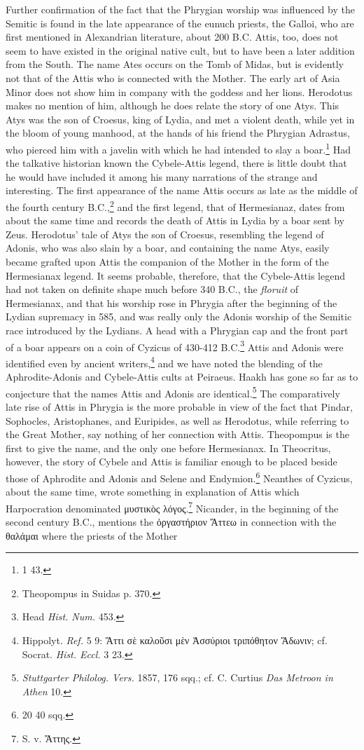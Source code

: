 \documentclass[a4paper, 11pt, oneside, polutonikogreek, english]{article}
\begin{document}
Further confirmation of the fact that the Phrygian worship was influenced by the Semitic is found in the late appearance of the eunuch priests, the Galloi, who are first mentioned in Alexandrian literature, about 200 \textsc{B.C.} Attis, too, does not seem to have existed in the original native cult, but to have been a later addition from the South. The name Ates occurs on the Tomb of Midas, but is evidently not that of the Attis who is connected with the Mother. The early art of Asia Minor does not show him in company with the goddess and her lions. Herodotus makes no mention of him, although he does relate the story of one Atys. This Atys was the son of Croesus, king of Lydia, and met a violent death, while yet in the bloom of young manhood, at the hands of his friend the Phrygian Adrastus, who pierced him with a javelin with which he had intended to slay a boar.\footnote{1 43.} Had the talkative historian known the Cybele-Attis legend, there is little doubt that he would have included it among his many narrations of the strange and interesting. The first appearance of the name Attis occurs as late as the middle of the fourth century \textsc{B.C.},\footnote{Theopompus in Suidas p. 370.} and the first legend, that of Hermesianaz, dates from about the same time and records the death of Attis in Lydia by a boar sent by Zeus. Herodotus' tale of Atys the son of Croesus, resembling the legend of Adonis, who was also slain by a boar, and containing the name Atys, easily became grafted upon Attis the companion of the Mother in the form of the Hermesianax legend. It seems probable, therefore, that the Cybele-Attis legend had not taken on definite shape much before 340 \textsc{B.C.}, the \emph{floruit} of Hermesianax, and that his worship rose in Phrygia after the beginning of the Lydian supremacy in 585, and was really only the Adonis worship of the Semitic race introduced by the Lydians. A head with a Phrygian cap and the front part of a boar appears on a coin of Cyzicus of 430-412 \textsc{B.C.}\footnote{Head \emph{Hist. Num.} 453.} Attis and Adonis were identified even by ancient writers,\footnote{Hippolyt. \emph{Ref.} 5 9: Ἄττι σὲ καλοῦσι μὲν Ἀσσύριοι τριπόθητον Ἄδωνιν; cf. Socrat. \emph{Hist. Eccl.} 3 23.} and we have noted the blending of the Aphrodite-Adonis and Cybele-Attis cults at Peiraeus. Haakh has gone so far as to conjecture that the names Attis and Adonis are identical.\footnote{\emph{Stuttgarter Philolog. Vers.} 1857, 176 sqq.; cf. C. Curtius \emph{Das Metroon in Athen} 10.} The comparatively late rise of Attis in Phrygia is the more probable in view of the fact that Pindar, Sophocles, Aristophanes, and Euripides, as well as Herodotus, while referring to the Great Mother, say nothing of her connection with Attis. Theopompus is the first to give the name, and the only one before Hermesianax. In Theocritus, however, the story of Cybele and Attis is familiar enough to be placed beside those of Aphrodite and Adonis and Selene and Endymion.\footnote{20 40 sqq.} Neanthes of Cyzicus, about the same time, wrote something in explanation of Attis which Harpocration denominated μυστικὸς λόγος.\footnote{S. v. Ἄττης.} Nicander, in the beginning of the second century \textsc{B.C.}, mentions the ὀργαστήριον Ἄττεω in connection with the θαλάμαι where the priests of the Mother 
\end{document}

